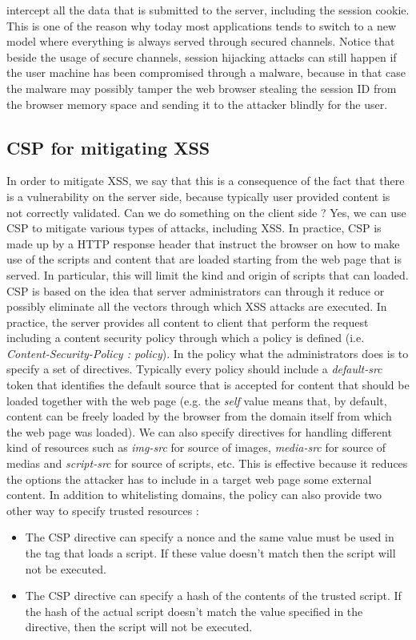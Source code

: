 intercept all the data that is submitted to the server, including the session cookie. This is one of the reason why today most applications tends to switch to a new model where everything is always served through secured channels. Notice that beside the usage of secure channels, session hijacking attacks can still happen if the user machine has been compromised through a malware, because in that case the malware may possibly tamper the web browser stealing the session ID from the browser memory space and sending it to the attacker blindly for the user.

\subsection{CSP for mitigating XSS}
In order to mitigate XSS, we say that this is a consequence of the fact that there is a vulnerability on the server side, because typically user provided content is not correctly validated. Can we do something on the client side ? Yes, we can use CSP to mitigate various types of attacks, including XSS. In practice, CSP is made up by a HTTP response header that instruct the browser on how to make use of the scripts and content that are loaded starting from the web page that is served. In particular, this will limit the kind and origin of scripts that can loaded. CSP is based on the idea that server administrators can through it reduce or possibly eliminate all the vectors through which XSS attacks are executed. In practice, the server provides all content to client that perform the request including a content security policy through which a policy is defined (i.e. \textit{Content-Security-Policy : policy}). In the policy what the administrators does is to specify a set of directives. Typically every policy should include a \textit{default-src} token that identifies the default source that is accepted for content that should be loaded together with the web page (e.g. the \textit{self} value means that, by default, content can be freely loaded by the browser from the domain itself from which the web page was loaded). We can also specify directives for handling different kind of resources such as \textit{img-src} for source of images, \textit{media-src} for source of medias and \textit{script-src} for source of scripts, etc. This is effective because it reduces the options the attacker has to include in a target web page some external content. In addition to whitelisting domains, the policy can also provide two other way to specify trusted resources :
\begin{itemize}
\item The CSP directive can specify a nonce and the same value must be used in the tag that loads a script. If these value doesn't match then the script will not be executed.
\item The CSP directive can specify a hash of the contents of the trusted script. If the hash of the actual script doesn't match the value specified in the directive, then the script will not be executed.
\end{itemize}

